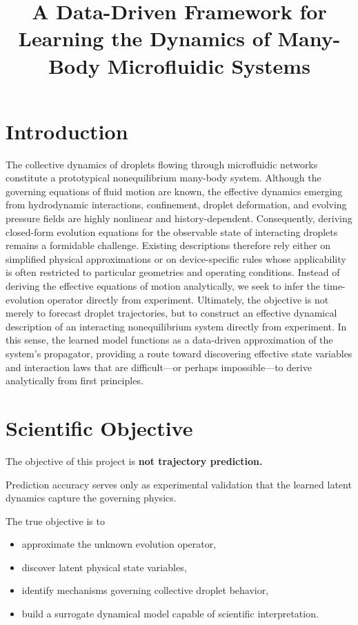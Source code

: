 \documentclass[11pt]{article}
\title{A Data-Driven Framework for Learning the Dynamics of Many-Body Microfluidic Systems}
\author{}
\date{}
\begin{document}
\maketitle

\tableofcontents
\newpage

\section{Introduction}

The collective dynamics of droplets flowing through microfluidic networks 
constitute a prototypical nonequilibrium many-body system. Although the 
governing equations of fluid motion are known, the effective dynamics 
emerging from hydrodynamic interactions, confinement, droplet deformation, 
and evolving pressure fields are highly nonlinear and history-dependent. 
Consequently, deriving closed-form evolution equations for the observable
state of interacting droplets remains a formidable challenge. Existing
descriptions therefore rely either on simplified physical approximations 
or on device-specific rules whose applicability is often restricted to 
particular geometries and operating conditions.
Instead of deriving the effective equations of motion analytically, 
we seek to infer the time-evolution operator directly from experiment. 
Ultimately, the objective is not merely to forecast droplet trajectories, 
but to construct an effective dynamical description of an interacting 
nonequilibrium system directly from experiment. In this sense, the 
learned model functions as a data-driven approximation of the system's 
propagator, providing a route toward discovering effective state variables 
and interaction laws that are difficult—or perhaps impossible—to derive 
analytically from first principles.

\section{Scientific Objective}

The objective of this project is \textbf{not trajectory prediction.}

Prediction accuracy serves only as experimental validation that the learned
latent dynamics capture the governing physics.

The true objective is to

\begin{itemize}
\item approximate the unknown evolution operator,
\item discover latent physical state variables,
\item identify mechanisms governing collective droplet behavior,
\item build a surrogate dynamical model capable of scientific interpretation.
\end{itemize}
\end{document}
